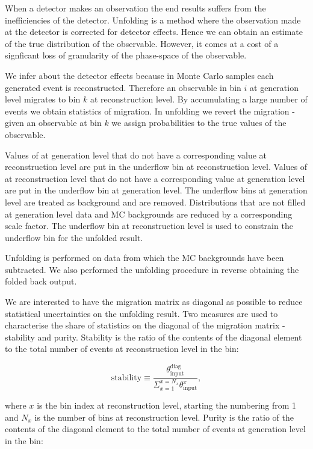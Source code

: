 When a detector makes an observation the end results suffers from the inefficiencies of the detector. Unfolding is a method where the observation made at the detector is corrected for detector effects. Hence we can obtain an estimate of the true distribution of the observable. However, it comes at a cost of a signficant loss of granularity of the phase-space of the observable.

We infer about the detector effects because in Monte Carlo samples each generated event is reconstructed. Therefore an observable in bin $i$ at generation level migrates to bin $k$ at reconstruction level. By accumulating a large number of events we obtain statistics of migration. In unfolding we revert the migration - given an observable at bin $k$ we assign probabilities to the true values of the observable.

Values of \pullangle at generation level that do not have a corresponding value at reconstruction level are put in the underflow bin at reconstruction level. Values of \pullangle at reconstruction level that do not have a corresponding value at generation level are put in the underflow bin at generation level. The underflow bins at generation level are treated as background and are removed. Distributions that are not filled at generation level \textendash data and MC backgrounds are reduced by a corresponding scale factor. The underflow bin at reconstruction level is used to constrain the underflow bin for the unfolded result.

Unfolding is performed on data from which the MC backgrounds have been subtracted. We also performed the unfolding procedure in reverse obtaining the folded back output.

We are interested to have the migration matrix as diagonal as possible to reduce statistical uncertainties on the unfolding result. Two measures are used to characterise the share of statistics on the diagonal of the migration matrix - stability and purity. Stability is the ratio of the contents of the diagonal element to the total number of events at reconstruction level in the bin:

\begin{equation}
  \text{stability}\equiv\frac{\theta^{\text{diag}}_{\text{input}}}{\Sigma_{x=1}^{x=N_{x}}\theta^{x}_{\text{input}}},
\end{equation}

\noindent where $x$ is the bin index at reconstruction level, starting the numbering from 1 and $N_{x}$ is the number of bins at reconstruction level. Purity is the ratio of the contents of the diagonal element to the total number of events at generation level in the bin:


